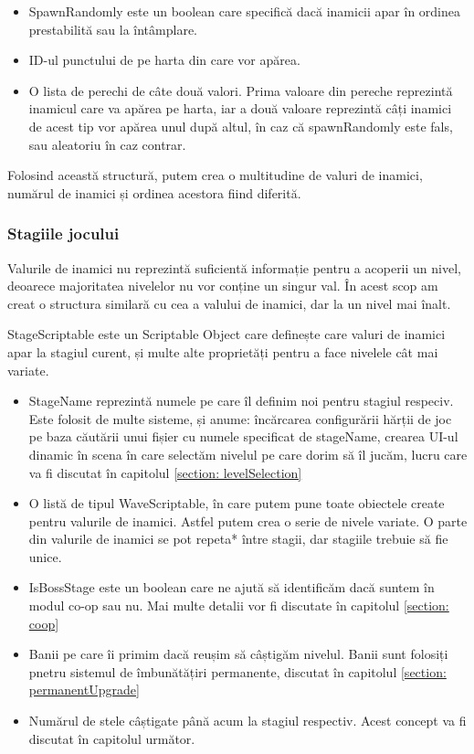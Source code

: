 \documentclass[12pt, a4paper]{article}
\begin{document}
	\begin{itemize}
		\item SpawnRandomly este un boolean care specifică dacă inamicii apar în ordinea prestabilită sau la întâmplare.
		\item ID-ul punctului de pe harta din care vor apărea.
		\item O lista de perechi de câte două valori. Prima valoare din pereche reprezintă inamicul care va apărea pe harta, iar a două valoare reprezintă câți inamici de acest tip vor apărea unul după altul, în caz că spawnRandomly este fals, sau aleatoriu în caz contrar.
	\end{itemize}
	
	Folosind această structură, putem crea o multitudine de valuri de inamici, numărul de inamici și ordinea acestora fiind diferită.
	
	
	
	
	
	\subsubsection{Stagiile jocului}
	\label{section: stageScriptable}
	
	Valurile de inamici nu reprezintă suficientă informație pentru a acoperii un nivel, deoarece majoritatea nivelelor nu vor conține un singur val. În acest scop am creat o structura similară cu cea a valului de inamici, dar la un nivel mai înalt.
	\newline
	
	StageScriptable este un Scriptable Object care definește care valuri de inamici apar la stagiul curent, și multe alte proprietăți pentru a face nivelele cât mai variate.
	
	\begin{itemize}
		\item StageName reprezintă numele pe care îl definim noi pentru stagiul respeciv. Este folosit de multe sisteme, și anume: încărcarea configurării hărții de joc pe baza căutării unui fișier cu numele specificat de stageName, crearea UI-ul dinamic în scena în care selectăm nivelul pe care dorim să îl jucăm, lucru care va fi discutat în capitolul \ref{section: levelSelection}
		\item O listă de tipul WaveScriptable, în care putem pune toate obiectele create pentru valurile de inamici. Astfel putem crea o serie de nivele variate. O parte din valurile de inamici se pot repeta* între stagii, dar stagiile trebuie să fie unice.
		\item IsBossStage este un boolean care ne ajută să identificăm dacă suntem în modul co-op sau nu. Mai multe detalii vor fi discutate în capitolul \ref{section: coop} 
		\item Banii pe care îi primim dacă reușim să câștigăm nivelul. Banii sunt folosiți pnetru sistemul de îmbunătățiri permanente, discutat în capitolul \ref{section: permanentUpgrade}
		\item Numărul de stele câștigate până acum la stagiul respectiv. Acest concept va fi discutat în capitolul următor.
	\end{itemize}
	
\end{document}
